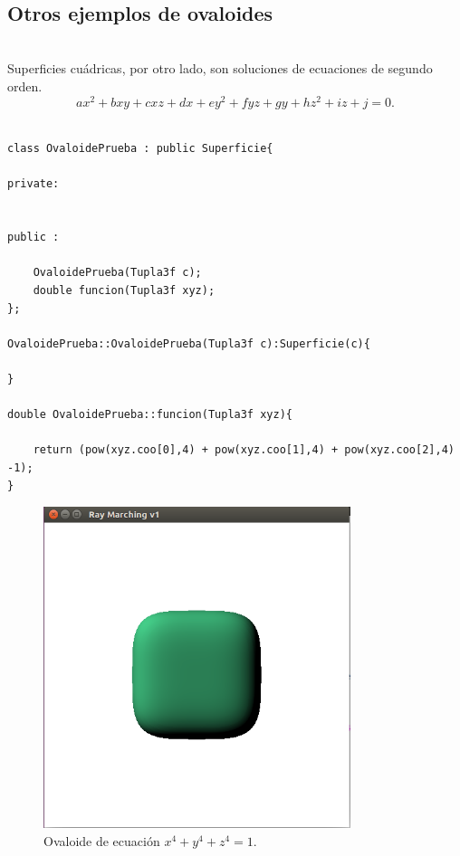 ${ }$\\
\subsection{Otros ejemplos de ovaloides}
${ }$\\


Superficies cuádricas, por otro lado, son soluciones de ecuaciones de segundo orden.
${ }$\\
\[
	ax^2 + bxy + cxz +dx +ey^2 +fyz +gy + hz^2 + iz +j = 0.
\]
${ }$\\

\begin{lstlisting}[style=Consola]
class OvaloidePrueba : public Superficie{

private:


public :

	OvaloidePrueba(Tupla3f c);
	double funcion(Tupla3f xyz);
};

OvaloidePrueba::OvaloidePrueba(Tupla3f c):Superficie(c){

}

double OvaloidePrueba::funcion(Tupla3f xyz){

	return (pow(xyz.coo[0],4) + pow(xyz.coo[1],4) + pow(xyz.coo[2],4) -1);
}
\end{lstlisting}

\begin{figure}[h]
	\begin{center}
		\includegraphics[width=0.8\textwidth]{imagenes/Ovaloid.png}
	\end{center}
	\caption{Ovaloide de ecuación $x^4 + y^4 + z^4 = 1$.}
	\label{fig:etiq_12}
\end{figure}



